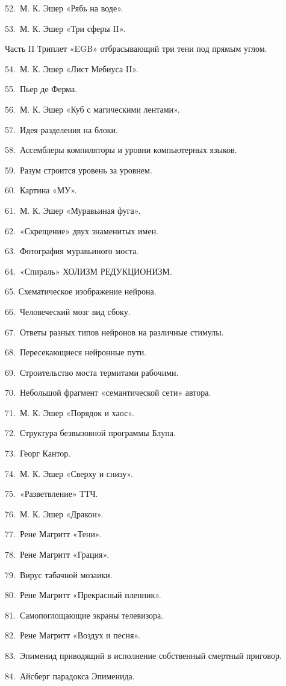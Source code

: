 52.~М. К. Эшер «Рябь на воде».

53.~М. К. Эшер «Три сферы II».

Часть II Триплет «EGB» отбрасывающий три тени под прямым углом.

54.~М. К. Эшер «Лист Мебиуса II».

55.~Пьер де Ферма.

56.~М. К. Эшер «Куб с магическими лентами».

57.~Идея разделения на блоки.

58.~Ассемблеры компиляторы и уровни компьютерных языков.

59.~Разум строится уровень за уровнем.

60.~Картина «МУ».

61.~М. К. Эшер «Муравьиная фуга».

62.~«Скрещение» двух знаменитых имен.

63.~Фотография муравьиного моста.

64.~«Спираль» ХОЛИЗМ РЕДУКЦИОНИЗМ.

65. Схематическое изображение нейрона.

66.~Человеческий мозг вид сбоку.

67.~Ответы разных типов нейронов на различные стимулы.

68.~Пересекающиеся нейронные пути.

69.~Строительство моста термитами рабочими.

70.~Небольшой фрагмент «семантической сети» автора.

71.~М. К. Эшер «Порядок и хаос».

72.~Структура безвызовной программы Блупа.

73.~Георг Кантор.

74.~М. К. Эшер «Сверху и снизу».

75.~«Разветвление» ТТЧ.

76.~М. К. Эшер «Дракон».

77.~Рене Магритт «Тени».

78.~Рене Магритт «Грация».

79.~Вирус табачной мозаики.

80.~Рене Магритт «Прекрасный пленник».

81.~Самопоглощающие экраны телевизора.

82.~Рене Магритт «Воздух и песня».

83.~Эпименид приводящий в исполнение собственный смертный приговор.

84.~Айсберг парадокса Эпименида.


